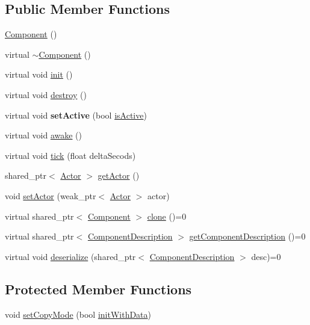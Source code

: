 \subsection*{Public Member Functions}
\begin{DoxyCompactItemize}
\item 
\hyperlink{class_component_a8775db6d1a2c1afc2e77cd3c8f39da6f}{Component} ()
\item 
virtual \hyperlink{class_component_ab8378fa275af98e568a7e91d33d867af}{$\sim$\+Component} ()
\item 
virtual void \hyperlink{class_component_a162f8cdc070537a71f2ad0b5e763b86f}{init} ()
\item 
virtual void \hyperlink{class_component_a77b8fff56ddce5dd0b4a9dabb0b5202b}{destroy} ()
\item 
\hypertarget{class_component_a8dcaa1d0ec8d0fbceca41cad03905ff2}{}virtual void {\bfseries set\+Active} (bool \hyperlink{class_component_a6dad4f819c0814eee8219e9b391cf583}{is\+Active})\label{class_component_a8dcaa1d0ec8d0fbceca41cad03905ff2}

\item 
virtual void \hyperlink{class_component_ae413974ecdbc8f65c6ff707b84278b0e}{awake} ()
\item 
virtual void \hyperlink{class_component_a72d67b02e6733c1a6fb73cbaaf8ebff4}{tick} (float delta\+Secods)
\item 
shared\+\_\+ptr$<$ \hyperlink{class_actor}{Actor} $>$ \hyperlink{class_component_a1c8bf7d2a699782d46fef1c1860ef23e}{get\+Actor} ()
\item 
void \hyperlink{class_component_a2115d06bfdbe42793fb750b5c4659ac3}{set\+Actor} (weak\+\_\+ptr$<$ \hyperlink{class_actor}{Actor} $>$ actor)
\item 
virtual shared\+\_\+ptr$<$ \hyperlink{class_component}{Component} $>$ \hyperlink{class_component_a74c984bd819bbef16fd4f306a90d34fe}{clone} ()=0
\item 
virtual shared\+\_\+ptr$<$ \hyperlink{class_component_description}{Component\+Description} $>$ \hyperlink{group__serialization__functions_gad6dca56c78283c5a036496ce8d386523}{get\+Component\+Description} ()=0
\item 
virtual void \hyperlink{group__serialization__functions_ga86158de289c38ea2b518043e1bb63f53}{deserialize} (shared\+\_\+ptr$<$ \hyperlink{class_component_description}{Component\+Description} $>$ desc)=0
\end{DoxyCompactItemize}
\subsection*{Protected Member Functions}
\begin{DoxyCompactItemize}
\item 
void \hyperlink{class_component_a1751659f91953e2452f2b45f034b3dea}{set\+Copy\+Mode} (bool \hyperlink{class_component_aab9de8ee5f46e5cc42607bb9243ccd6d}{init\+With\+Data})
\end{DoxyCompactItemize}
